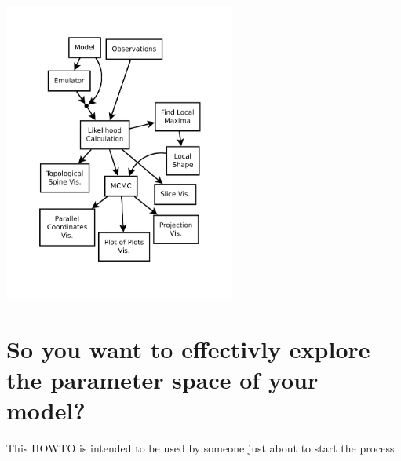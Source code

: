 \documentclass{article}
\begin{document}
\begin{center}
\includegraphics[width=3in]{figures/MADAI_Stats_and_Vis.pdf}
\end{center}


\section{ So you want to effectivly explore the parameter space of your model?}

This HOWTO is intended to be used by someone just about to start the
process
\end{document}

